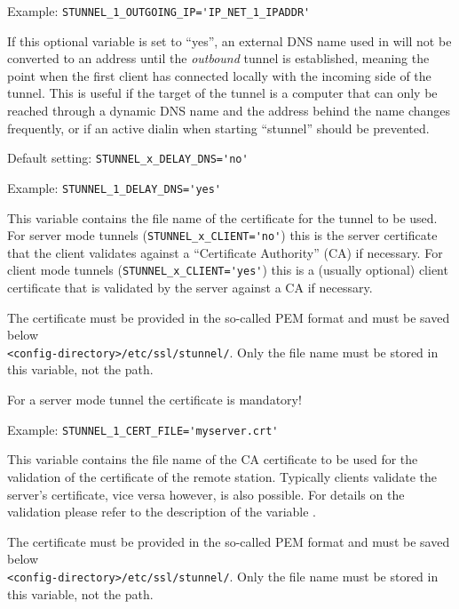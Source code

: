 \begin{description}
Example: \verb+STUNNEL_1_OUTGOING_IP='IP_NET_1_IPADDR'+


If this optional variable is set to ``yes'', an external DNS name used in
 will not be converted to an address until the
\emph{outbound} tunnel is established, meaning the point when the first client
has connected locally with the incoming side of the tunnel. This is useful if
the target of the tunnel is a computer that can only be reached through a
dynamic DNS name and the address behind the name changes frequently, or if
an active dialin when starting ``stunnel'' should be prevented.

Default setting: \verb+STUNNEL_x_DELAY_DNS='no'+

Example: \verb+STUNNEL_1_DELAY_DNS='yes'+


This variable contains the file name of the certificate for the tunnel to be used.
For server mode tunnels (\verb+STUNNEL_x_CLIENT='no'+) this is the server
certificate that the client validates against a ``Certificate Authority'' (CA)
if necessary. For client mode tunnels (\verb+STUNNEL_x_CLIENT='yes'+)
this is a (usually optional) client certificate that is validated by the
server against a CA if necessary.

The certificate must be provided in the so-called PEM format and must be saved below\\
\texttt{<config-directory>/etc/ssl/stunnel/}. Only the file name must be stored
in this variable, not the path.

For a server mode tunnel the certificate is mandatory!

Example: \verb+STUNNEL_1_CERT_FILE='myserver.crt'+


This variable contains the file name of the CA certificate to be used for the
validation of the certificate of the remote station. Typically clients validate
the server's certificate, vice versa however, is also possible. For details on
the validation please refer to the description of the variable 
{}.

The certificate must be provided in the so-called PEM format and must be saved below\\
\texttt{<config-directory>/etc/ssl/stunnel/}. Only the file name must be stored
in this variable, not the path.


\end{description}
